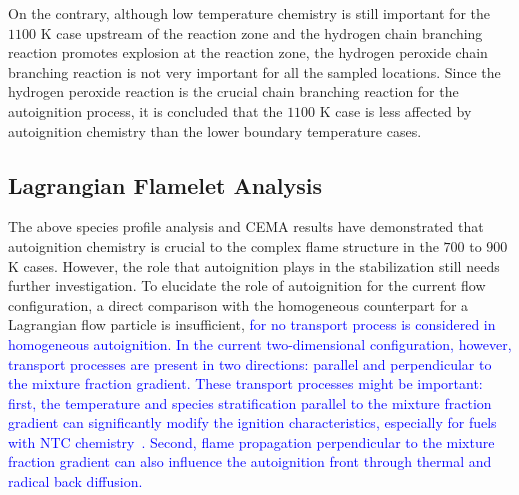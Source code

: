 \documentclass[review,3p,times]{elsarticle}
\begin{document}

On the contrary, although low temperature chemistry is still important for the $1100$ K case upstream of the reaction zone and the hydrogen chain branching reaction promotes explosion at the reaction zone, the hydrogen peroxide chain branching reaction is not very important for all the sampled locations.  Since the hydrogen peroxide reaction is the crucial chain branching reaction for the autoignition process, it is concluded that the $1100$ K case is less affected by autoignition chemistry than the lower boundary temperature cases.  

\subsection{Lagrangian Flamelet Analysis} \label{sec:LFA}
The above species profile analysis and CEMA results have demonstrated that autoignition chemistry is crucial to the complex flame structure in the $700$ to $900$ K cases.  However, the role that autoignition plays in the stabilization still needs further investigation.  To elucidate the role of autoignition for the current flow configuration, a direct comparison with the homogeneous counterpart for a Lagrangian flow particle is insufficient, \textcolor{blue}{for no transport process is considered in homogeneous autoignition.  In the current two-dimensional configuration, however, transport processes are present in two directions: parallel and perpendicular to the mixture fraction gradient.  These transport processes might be important: first, the temperature and species stratification parallel to the mixture fraction gradient can significantly modify the ignition characteristics, especially for fuels with NTC chemistry~\cite{law12,deng14}.  Second, flame propagation perpendicular to the mixture fraction gradient can also influence the autoignition front through thermal and radical back diffusion.}
\end{document}
